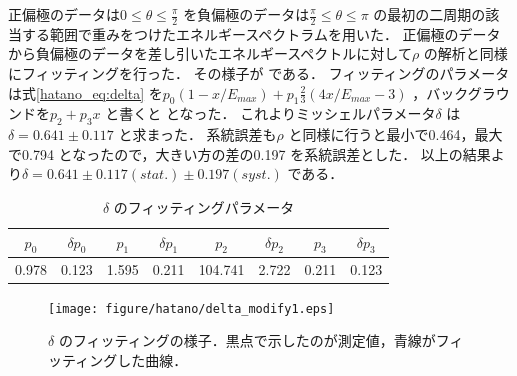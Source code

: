 正偏極のデータは$0\leq\theta\leq\frac{\pi}{2}$ を負偏極のデータは$\frac{\pi}{2}\leq\theta\leq\pi$ の最初の二周期の該当する範囲で重みをつけたエネルギースペクトラムを用いた．
正偏極のデータから負偏極のデータを差し引いたエネルギースペクトルに対して$\rho$ の解析と同様にフィッティングを行った．
その様子が である．
フィッティングのパラメータは式\eqref{hatano_eq:delta} を$p_0(1-x/E_{max})+p_1\frac{2}{3}(4x/E_{max}-3)$ ，バックグラウンドを$p_2+p_3x$ と書くと となった．
これよりミッシェルパラメータ$\delta$ は$\delta=0.641\pm0.117$ と求まった．
系統誤差も$\rho$ と同様に行うと最小で0.464，最大で0.794 となったので，大きい方の差の0.197 を系統誤差とした．
以上の結果より$\delta=0.641\pm0.117 (stat.) \pm0.197 (syst.)$ である．

\begin{table}[hbt]
\centering
\caption{$\delta$ のフィッティングパラメータ}
\begin{tabular}{cc|cc|cc|cc}
$p_0$ & $\delta p_0$ & $p_1$ & $\delta p_1$ & $p_2$ & $\delta p_2$ & $p_3$ & $\delta p_3$ \\ \hline
0.978 & 0.123 & 1.595 & 0.211 & 104.741 & 2.722 & 0.211 & 0.123 \\
\end{tabular}
\label{hatano_tab:delta}
\end{table}

\begin{figure}[hbt]
\centering
\texttt{[image: figure/hatano/delta\_modify1.eps]}
\caption{$\delta$ のフィッティングの様子．黒点で示したのが測定値，青線がフィッティングした曲線．}
\label{hatano_fig:delta}
\end{figure}

%
